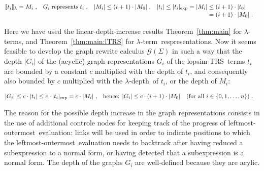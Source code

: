 \documentclass[
submission
]{dmtcs-episciences-tampered}
\newcommand{\fap}[2]{#1({#2})}
\newcommand{\iap}[2]{#1 _{#2}}
\newcommand{\indap}[2]{#1 _{#2}}
\newcommand{\nb}{\nobreakdash}
\newcommand{\nf}{\normalfont}
\newcommand{\punc}[1]{\ensuremath{\hspace*{3pt}{#1}}}
\newcommand{\setexp}[1]{\left\{{#1}\right\}}
\newcommand{\bter}{t}
\newcommand{\bteri}{\indap{\bter}}
\newcommand{\asig}{\Sigma}
\newcommand{\sdepth}{\text{\nf d}}
\newcommand{\depth}[1]{\lvert{#1}\rvert} \newcommand{\depthbig}[1]{\big\lvert{#1}\big\rvert} \newcommand{\sudepth}{\indap{\sdepth}{\text{\nf u}}}
\newcommand{\expdepth}[1]{\lvert{#1}\rvert_{\scriptexp}}
\newcommand{\denlter}[1]{\llbracket{#1}\rrbracket_{\sslabs}}
\newcommand{\lopsimTRS}{lopsim-TRS}
\newcommand{\alter}{M}
\newcommand{\alteri}{\indap{\alter}}
\newcommand{\sslabs}{\lambda}
\newcommand{\scriptexp}{\text{\nf exp}}
\newcommand{\lambdaterm}{$\lambda$\nb-term}
\newcommand{\lambdaterms}{\lambdaterm{s}}
\newcommand{\lambdadepth}{$\sslabs$\nb-depth}
\newcommand{\lo}{left\-most-outer\-most}
\newcommand{\graphcal}{\mathcal{G}}
\newcommand{\graphcalwrt}{\fap{\graphcal}}
\newcommand{\agraph}{G}
\newcommand{\agraphi}{\iap{\agraph}}
\theoremstyle{plain}
\theoremstyle{definition}
\begin{document}
\begin{center}
  $
  \begin{aligned}
    \denlter{\bteri{i}}
      & =
    \alteri{i} \punc{,}
      & 
    \agraphi{i} \; & \text{represents} \; \bteri{i} \punc{,}
      & 
    \depth{\alteri{i}} & \le (i+1) \cdot \depth{\alteri{0}} \punc{,}
      &
    \depth{\bteri{i}} 
      \le
    \expdepth{\bteri{i}} & = \depth{\alteri{i}} \begin{aligned}[t]
                                                 &
                                                 \le (i+1) \cdot \depth{\bteri{0}}  
                                                 \\[-0.5ex]
                                                 &
                                                 =   (i+1) \cdot \depth{\alteri{0}} \punc{.} 
                                               \end{aligned}                   
  \end{aligned}
  $
\end{center}
Here we have used the linear-depth-increase results Theorem~\ref{thm:main} for \lambdaterms, 
and Theorem~\ref{thm:main:lTRS} for \lambdaterm\ respresentations.  
Now it seems feasible to develop the graph rewrite calculus $\graphcalwrt{\asig}$ in such a way
that the depth $\depth{\agraphi{i}}$ of the (acyclic) graph representations $\agraphi{i}$ of the \lopsimTRS\ terms $\bteri{i}$ 
are bounded by a constant $c$ multiplied with the depth of $\bteri{i}$,
and consequently also bounded by $c$ multiplied with the \lambdadepth\ of $\bteri{i}$, or the depth of $\alteri{i}$:
\begin{center}
  $
  \begin{aligned}
    \depth{\agraphi{i}} & \le c \cdot \depth{\bteri{i}} \le c \cdot \expdepth{\bteri{i}} = c \cdot \depth{\alteri{i}} \punc{,}
      & 
    \text{hence: }
    \depth{\agraphi{i}} & \le c \cdot (i+1) \cdot \depth{\alteri{0}} 
    & & \text{(for all $i\in\setexp{0,1,\ldots,n}$)}  \punc{.}    
  \end{aligned}
  $
\end{center}
The reason for the possible depth increase in the graph representations 
consists in the use of additional controle nodes for keeping track of the progress of \lo\ evaluation: 
links will be used in order to indicate positions to which the \lo\ evaluation needs to backtrack
after having reduced a subexpression to a normal form, or having detected that a subexpression is a normal form. 
The depth of the graphs $\agraphi{i}$ are well-defined because they are acylic. 
\end{document}
